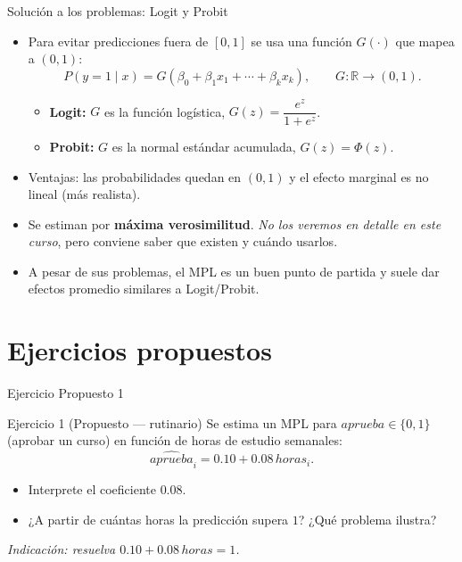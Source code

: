 \documentclass{beamer}
\begin{document}
\begin{frame}{Solución a los problemas: Logit y Probit}
\begin{itemize}
    \item Para evitar predicciones fuera de $[0,1]$ se usa una función $G(\cdot)$ que mapea a $(0,1)$:
    \[
    P(y=1\mid x) = G(\beta_0+\beta_1 x_1+\cdots+\beta_k x_k),\qquad G:\mathbb{R}\to(0,1).
    \]
    \begin{itemize}
        \item \textbf{Logit:} $G$ es la función logística, $G(z)=\dfrac{e^z}{1+e^z}$.
        \item \textbf{Probit:} $G$ es la normal estándar acumulada, $G(z)=\Phi(z)$.
    \end{itemize}
    \pause
    \item Ventajas: las probabilidades quedan en $(0,1)$ y el efecto marginal es no lineal (más realista).
    \item Se estiman por \textbf{máxima verosimilitud}. \textit{No los veremos en detalle en este curso}, pero conviene saber que existen y cuándo usarlos.
    \item A pesar de sus problemas, el MPL es un buen punto de partida y suele dar efectos promedio similares a Logit/Probit.
\end{itemize}
\end{frame}

\section{Ejercicios propuestos}

\begin{frame}{Ejercicio Propuesto 1}
\begin{block}{Ejercicio 1 (Propuesto — rutinario)}
Se estima un MPL para $aprueba\in\{0,1\}$ (aprobar un curso) en función de horas de estudio semanales:
\[
\hat{aprueba}_i = 0.10 + 0.08\,horas_i.
\]
\begin{itemize}
    \item Interprete el coeficiente $0.08$.
    \item ¿A partir de cuántas horas la predicción supera $1$? ¿Qué problema ilustra?
\end{itemize}
\end{block}
{\small \textit{Indicación: resuelva $0.10+0.08\,horas=1$.}}
\end{frame}
\end{document}
